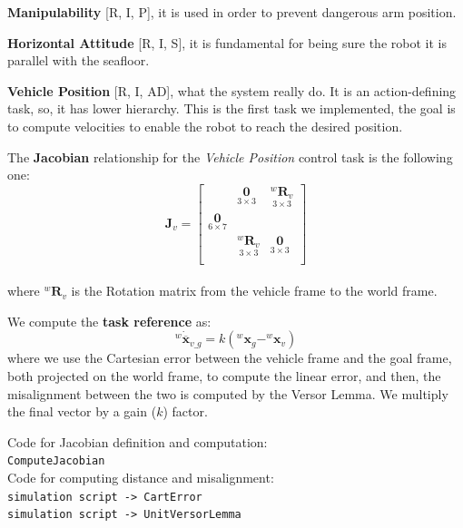 \documentclass{article}
\begin{document}
\noindent
\begin{description}
	\item \textbf{Manipulability} [R, I, P], it is used in order to prevent dangerous arm position.
	\item \textbf{Horizontal Attitude} [R, I, S], it is fundamental for being sure the robot it is parallel with the seafloor. 
	\item \textbf{Vehicle Position} [R, I, AD], what the system really do. It is an action-defining task, so, it has lower hierarchy. This is the first task we implemented, the goal is to compute velocities to enable the robot to reach the desired position.
\end{description}

\noindent
\vspace{5px}
The \textbf{Jacobian} relationship for the \textit{Vehicle Position} control task is the following one:
\begin{equation}
    \boldsymbol{J}_v = \begin{bmatrix}
 & \underset{3\times3}{\boldsymbol{0}} & \underset{3\times3}{^{w}\boldsymbol{R}_{v}} \\
\underset{6\times7}{\boldsymbol{0}} \\
& \underset{ 3\times 3}{^{w}\boldsymbol{R}_{v}} & \underset{3\times 3}{\boldsymbol{0}} \\
\end{bmatrix}
\end{equation}
\\ 
where ${^{w}\boldsymbol{R}_{v}}$ is the Rotation matrix from the vehicle frame to the world frame.

\noindent
\vspace{5px}
We compute the \textbf{task reference} as:
\begin{equation}
    ^{w}\dot{\overline{\boldsymbol{x}}}_{v\_g}=k\left(^{w} \boldsymbol{x}_{g}-^{w} \boldsymbol{x}_{v}\right)
\end{equation}
where we use the Cartesian error between the vehicle frame and the goal frame, both projected on the world frame, to compute the linear error, and then, the misalignment between the two is computed by the Versor Lemma. We multiply the final vector by a gain ($k$) factor.

\colorbox{mygray}{\parbox{0.9\textwidth}{
Code for Jacobian definition and computation: \\
\texttt{ComputeJacobian}\\
Code for computing distance and misalignment: \\
\texttt{simulation script -> CartError} \\
\texttt{simulation script -> UnitVersorLemma}
}}
\end{document}
